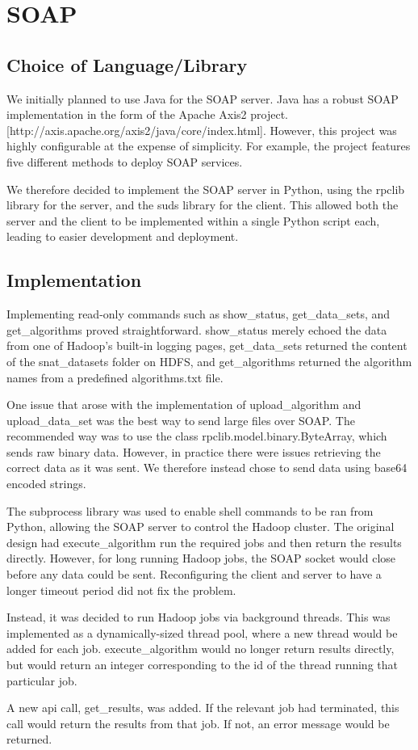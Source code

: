 \section{SOAP}

\subsection{Choice of Language/Library}

We initially planned to use Java for the SOAP server. Java has a robust SOAP implementation in the form of the Apache Axis2 project. [http://axis.apache.org/axis2/java/core/index.html]. However, this project was highly configurable at the expense of simplicity. For example, the project features five different methods to deploy SOAP services.

We therefore decided to implement the SOAP server in Python, using the rpclib library for the server, and the suds library for the client. This allowed both the server and the client to be implemented within a single Python script each, leading to easier development and deployment.

\subsection{Implementation}

Implementing read-only commands such as show\_status, get\_data\_sets, and get\_algorithms proved straightforward. show\_status merely echoed the data from one of Hadoop's built-in logging pages, get\_data\_sets returned the content of the snat\_datasets folder on HDFS, and get\_algorithms returned the algorithm names from a predefined algorithms.txt file.

One issue that arose with the implementation of upload\_algorithm and upload\_data\_set was the best way to send large files over SOAP. The recommended way was to use the class rpclib.model.binary.ByteArray, which sends raw binary data. However, in practice there were issues retrieving the correct data as it was sent. We therefore instead chose to send data using base64 encoded strings.

The subprocess library was used to enable shell commands to be ran from Python, allowing the SOAP server to control the Hadoop cluster. The original design had execute\_algorithm run the required jobs and then return the results directly. However, for long running Hadoop jobs, the SOAP socket would close before any data could be sent. Reconfiguring the client and server to have a longer timeout period did not fix the problem.

Instead, it was decided to run Hadoop jobs via background threads. This was implemented as a dynamically-sized thread pool, where a new thread would be added for each job. execute\_algorithm would no longer return results directly, but would return an integer corresponding to the id of the thread running that particular job.

A new api call, get\_results, was added. If the relevant job had terminated, this call would return the results from that job. If not, an error message would be returned.
